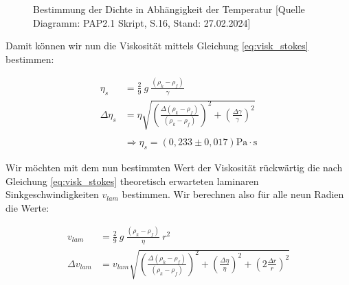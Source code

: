 \documentclass{article}
\begin{document}
\begin{figure}[!h]
    \centering
    \caption{Bestimmung der Dichte in Abhängigkeit der Temperatur [Quelle Diagramm: PAP2.1 Skript, S.16, Stand: 27.02.2024]}
    \label{fig:Dichte_f}
\end{figure}

\phantom{.}

Damit können wir nun die Viskosität mittels Gleichung \ref{eq:visk_stokes} bestimmen:

\begin{equation}
    \begin{split}
        \eta_s &= \frac{2}{9} \ g \ \frac{(\rho_k - \rho_f)}{\gamma} \\
        \Delta \eta_s &= \eta \sqrt{\left( \frac{\Delta (\rho_k - \rho_f)}{(\rho_k - \rho_f)} \right)^2 + \left( \frac{\Delta \gamma}{\gamma} \right)^2} \\ \\
        &\Rightarrow \eta_s = (0,233 \pm 0,017) \text{Pa} \cdot \text{s}
    \end{split}
\end{equation}

Wir möchten mit dem nun bestimmten Wert der Viskosität rückwärtig die nach Gleichung \ref{eq:visk_stokes}
theoretisch erwarteten laminaren Sinkgeschwindigkeiten $v_{lam}$ bestimmen. Wir berechnen also für alle neun Radien die Werte:

\begin{equation}
    \begin{split}
        v_{lam} &= \frac{2}{9} \ g \ \frac{(\rho_k - \rho_f)}{\eta} \ r^2 \\
        \Delta v_{lam} &= v_{lam} \sqrt{\left( \frac{\Delta (\rho_k - \rho_f)}{(\rho_k - \rho_f)} \right)^2 + \left( \frac{\Delta \eta}{\eta} \right)^2 + \left( 2 \frac{\Delta r}{r} \right)^2}
    \end{split}
\end{equation}
\end{document}
